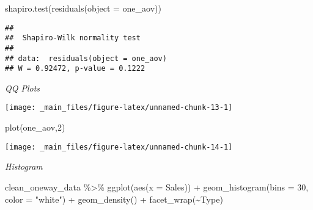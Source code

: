 \documentclass[
]{book}
\newenvironment{Shaded}{\begin{snugshade}}{\end{snugshade}}
\newcommand{\AttributeTok}[1]{\textcolor[rgb]{0.77,0.63,0.00}{#1}}
\newcommand{\DecValTok}[1]{\textcolor[rgb]{0.00,0.00,0.81}{#1}}
\newcommand{\FunctionTok}[1]{\textcolor[rgb]{0.00,0.00,0.00}{#1}}
\newcommand{\NormalTok}[1]{#1}
\newcommand{\SpecialCharTok}[1]{\textcolor[rgb]{0.00,0.00,0.00}{#1}}
\newcommand{\StringTok}[1]{\textcolor[rgb]{0.31,0.60,0.02}{#1}}
\begin{document}
\begin{Shaded}
\begin{Highlighting}[]
\FunctionTok{shapiro.test}\NormalTok{(}\FunctionTok{residuals}\NormalTok{(}\AttributeTok{object =}\NormalTok{ one\_aov))}
\end{Highlighting}
\end{Shaded}

\begin{verbatim}
## 
##  Shapiro-Wilk normality test
## 
## data:  residuals(object = one_aov)
## W = 0.92472, p-value = 0.1222
\end{verbatim}

\emph{QQ Plots}

\begin{Shaded}
\end{Shaded}

\begin{center}\texttt{[image: \_main\_files/figure-latex/unnamed-chunk-13-1]} \end{center}

\begin{Shaded}
\begin{Highlighting}[]
\FunctionTok{plot}\NormalTok{(one\_aov,}\DecValTok{2}\NormalTok{)}
\end{Highlighting}
\end{Shaded}

\begin{center}\texttt{[image: \_main\_files/figure-latex/unnamed-chunk-14-1]} \end{center}

\emph{Histogram}

\begin{Shaded}
\begin{Highlighting}[]
\NormalTok{clean\_oneway\_data }\SpecialCharTok{\%\textgreater{}\%} 
  \FunctionTok{ggplot}\NormalTok{(}\FunctionTok{aes}\NormalTok{(}\AttributeTok{x =}\NormalTok{ Sales)) }\SpecialCharTok{+} 
  \FunctionTok{geom\_histogram}\NormalTok{(}\AttributeTok{bins =} \DecValTok{30}\NormalTok{, }\AttributeTok{color =} \StringTok{"white"}\NormalTok{) }\SpecialCharTok{+} 
  \FunctionTok{geom\_density}\NormalTok{() }\SpecialCharTok{+} 
  \FunctionTok{facet\_wrap}\NormalTok{(}\SpecialCharTok{\textasciitilde{}}\NormalTok{Type)}
\end{Highlighting}
\end{Shaded}
\end{document}
